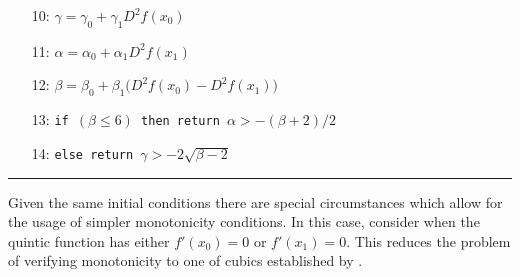\documentclass{scspaperproc}
\theoremstyle{scsthe}
\begin{document}
\begin{itemize}
\begin{itemize}
  \end{itemize}
\item[10:] $\gamma = \gamma_0 + \gamma_1 D^2f(x_0)$
\item[11:] $\alpha = \alpha_0 + \alpha_1 D^2f(x_1)$
\item[12:] $\beta = \beta_0 + \beta_1 \big(D^2f(x_0) - D^2f(x_1)\big)$
\item[13:] \texttt{if $(\beta \leq 6)$ then return $\alpha > - (\beta + 2) / 2$}
\item[14:] \texttt{else return $\gamma > -2 \sqrt{\beta - 2}$ }

\end{itemize}
\hrule
\vspace{10pt}


Given the same initial conditions there are special circumstances which allow for the usage of simpler monotonicity conditions. In this case, consider when the quintic function has either $f'(x_0) = 0$ or $f'(x_1) = 0.$ This reduces the problem of verifying monotonicity to one of cubics established by \cite{schmidt1988positivity}.
\end{document}
